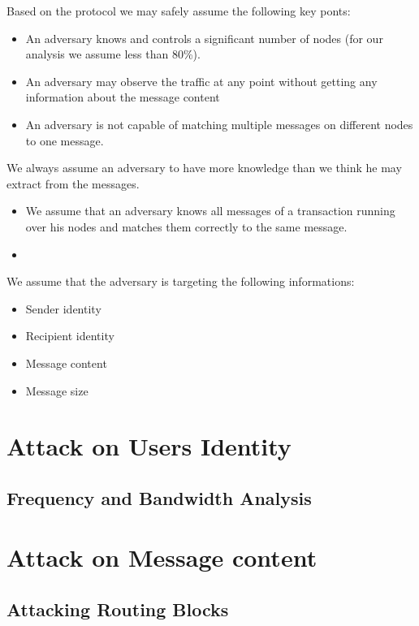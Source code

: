 Based on the protocol we may safely assume the following key ponts:
\begin{itemize}
	\item An adversary knows and controls a significant number of nodes (for our analysis we assume less than 80\%).
	\item An adversary may observe the traffic at any point without getting any information about the message content
	\item An adversary is not capable of matching multiple messages on different nodes to one message.
\end{itemize}

We always assume an adversary to have more knowledge than we think he may extract from the messages.
\begin{itemize}
	\item We assume that an adversary knows all messages of a transaction running over his nodes and matches them correctly to the same message.
	\item 
\end{itemize}

We assume that the adversary is targeting the following informations:
\begin{itemize}
	\item Sender identity
	\item Recipient identity
	\item Message content
	\item Message size
\end{itemize}

\section{Attack on Users Identity}

\subsection{Frequency and Bandwidth Analysis}

\section{Attack on Message content}

\subsection{Attacking Routing Blocks}

